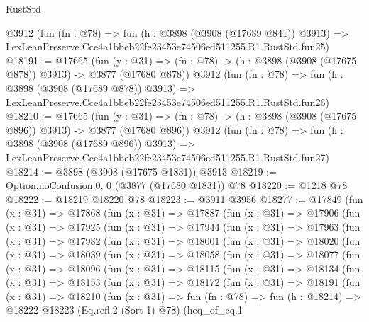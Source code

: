 \begin{lexlean}{RustStd}
\begin{coremodule}
    @3912
    (fun (fn : @78) =>
    fun (h : @3898 (@3908 (@17689 @841)) @3913) =>
    LexLeanPreserve.Cce4a1bbeb22fe23453e74506ed511255.R1.RustStd.fun25)
@18191 := @17665
    (fun (y : @31) => (fn : @78) -> (h : @3898 (@3908 (@17675 @878)) @3913) -> @3877 (@17680 @878))
    @3912
    (fun (fn : @78) =>
    fun (h : @3898 (@3908 (@17689 @878)) @3913) =>
    LexLeanPreserve.Cce4a1bbeb22fe23453e74506ed511255.R1.RustStd.fun26)
@18210 := @17665
    (fun (y : @31) => (fn : @78) -> (h : @3898 (@3908 (@17675 @896)) @3913) -> @3877 (@17680 @896))
    @3912
    (fun (fn : @78) =>
    fun (h : @3898 (@3908 (@17689 @896)) @3913) =>
    LexLeanPreserve.Cce4a1bbeb22fe23453e74506ed511255.R1.RustStd.fun27)
@18214 := @3898 (@3908 (@17675 @1831)) @3913
@18219 := Option.noConfusion.{0, 0} (@3877 (@17680 @1831)) @78
@18220 := @1218 @78
@18222 := @18219 @18220 @78
@18223 := @3911 @3956
@18277 := @17849
    (fun (x : @31) =>
    @17868
      (fun (x : @31) =>
      @17887
        (fun (x : @31) =>
        @17906
          (fun (x : @31) =>
          @17925
            (fun (x : @31) =>
            @17944
              (fun (x : @31) =>
              @17963
                (fun (x : @31) =>
                @17982
                  (fun (x : @31) =>
                  @18001
                    (fun (x : @31) =>
                    @18020
                      (fun (x : @31) =>
                      @18039
                        (fun (x : @31) =>
                        @18058
                          (fun (x : @31) =>
                          @18077
                            (fun (x : @31) =>
                            @18096
                              (fun (x : @31) =>
                              @18115
                                (fun (x : @31) =>
                                @18134
                                  (fun (x : @31) =>
                                  @18153
                                    (fun (x : @31) =>
                                    @18172
                                      (fun (x : @31) =>
                                      @18191
                                        (fun (x : @31) =>
                                        @18210
                                          (fun (x : @31) =>
                                          fun (fn : @78) =>
                                          fun (h : @18214) =>
                                          @18222
                                            @18223
                                            (Eq.refl.{2} (Sort 1) @78)
                                            (heq_of_eq.{1}

\end{coremodule}
\end{lexlean}
